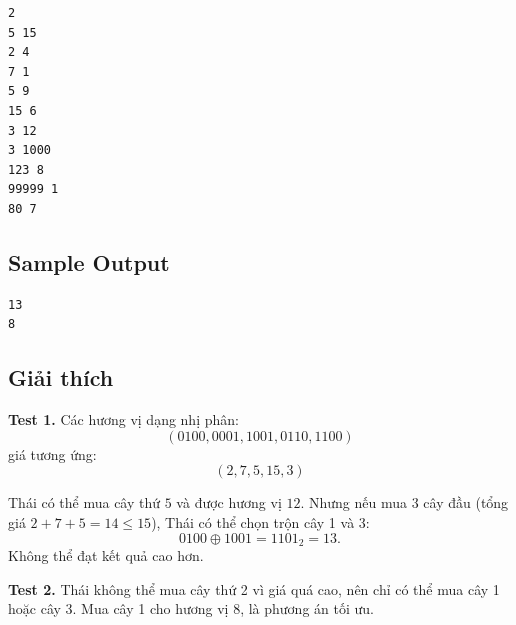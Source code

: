 \begin{verbatim}
2
5 15
2 4
7 1
5 9
15 6
3 12
3 1000
123 8
99999 1
80 7
\end{verbatim}

\subsection*{Sample Output}

\begin{verbatim}
13
8
\end{verbatim}

\subsection*{Giải thích}

\textbf{Test 1.}  
Các hương vị dạng nhị phân:  
\[
(0100, 0001, 1001, 0110, 1100)
\]
giá tương ứng:
\[
(2, 7, 5, 15, 3)
\]

Thái có thể mua cây thứ $5$ và được hương vị $12$.  
Nhưng nếu mua 3 cây đầu (tổng giá $2+7+5 = 14 \le 15$), Thái có thể chọn trộn cây 1 và 3:
\[
0100 \oplus 1001 = 1101_2 = 13.
\]
Không thể đạt kết quả cao hơn.

\textbf{Test 2.}  
Thái không thể mua cây thứ 2 vì giá quá cao, nên chỉ có thể mua cây 1 hoặc cây 3.  
Mua cây 1 cho hương vị $8$, là phương án tối ưu.
